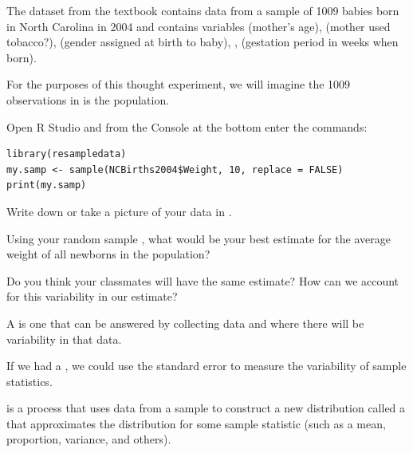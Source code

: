 The dataset \textit{\textbf{}} from the textbook contains data from a sample of 1009 babies born in North Carolina in 2004 and contains variables  (mother's age),  (mother used tobacco?),  (gender assigned at birth to baby), ,  (gestation period in weeks when born).

\bi
\ii For the purposes of this thought experiment, we will imagine the 1009 observations in \textit{\textbf{}} is the population.
\ei

\bb[resume]
\ii Open R Studio and from the Console at the bottom enter the commands:\label{q:newborn}
\begin{lstlisting}
library(resampledata) 
my.samp <- sample(NCBirths2004$Weight, 10, replace = FALSE) 
print(my.samp)
\end{lstlisting}

\bb
\ii Write down or take a picture of your data in \textit{\textbf{}}. \vspace{1in}

\ii Using your random sample \textit{\textbf{}}, what would be your best estimate for the average weight of all newborns in the population? \vspace{1in}

\ii Do you think your classmates will have the same estimate? How can we account for this variability in our estimate?  \vspace{1in}

\ee

\ee

\bigskip


\bbox
A \textbf{} is one that can be answered by collecting data and where there will be variability in that data.
\ebox


\clearpage



If we had a \textbf{}, we could use the standard error to measure the variability of sample statistics. \textbf{}

\bbox
\textbf{} is a process that uses data from a sample to construct a new distribution called a \textbf{} that approximates the distribution for some sample statistic (such as a mean, proportion, variance, and others). %
\ms

